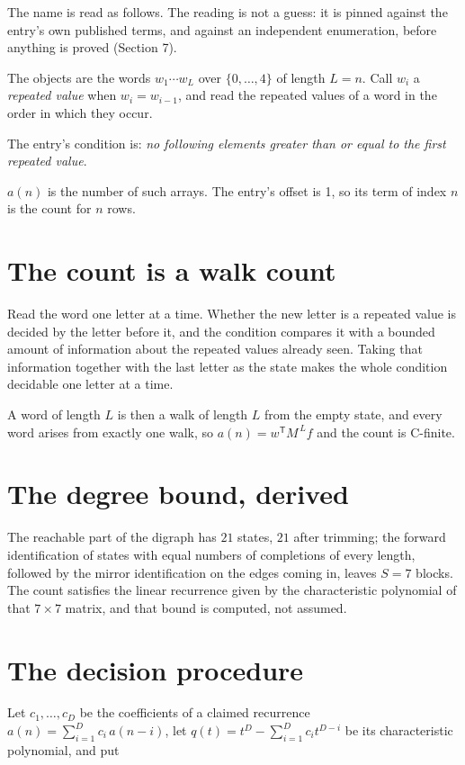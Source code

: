 \documentclass[11pt]{article}
\theoremstyle{definition}
\begin{document}
The name is read as follows. The reading is not a guess: it is pinned against the entry's own published terms, and against an independent enumeration, before anything is proved (Section 7).

The objects are the words $w_1\cdots w_L$ over $\{0,\dots,4\}$ of length $L = n$. Call $w_i$ a {\itshape repeated value} when $w_i = w_{i-1}$, and read the repeated values of a word in the order in which they occur.

The entry's condition is: {\itshape no following elements greater than or equal to the first repeated value}.

$a(n)$ is the number of such arrays. The entry's offset is 1, so its term of index $n$ is the count for $n$ rows.

\section{The count is a walk count}

Read the word one letter at a time. Whether the new letter is a repeated value is decided by the letter before it, and the condition compares it with a bounded amount of information about the repeated values already seen. Taking that information together with the last letter as the state makes the whole condition decidable one letter at a time.

A word of length $L$ is then a walk of length $L$ from the empty state, and every word arises from exactly one walk, so $a(n) = w^{\mathsf T}M^{\,L}f$ and the count is C-finite.

\section{The degree bound, derived}

The reachable part of the digraph has $21$ states, $21$ after trimming; the forward identification of states with equal numbers of completions of every length, followed by the mirror identification on the edges coming in, leaves $S = 7$ blocks. The count satisfies the linear recurrence given by the characteristic polynomial of that $7\times7$ matrix, and that bound is computed, not assumed.

\section{The decision procedure}

Let $c_1,\dots,c_D$ be the coefficients of a claimed recurrence $a(n) = \sum_{i=1}^{D} c_i\,a(n-i)$, let $q(t) = t^{D} - \sum_{i=1}^{D} c_i t^{D-i}$ be its characteristic polynomial, and put
\end{document}
